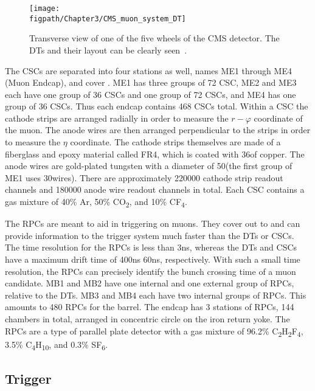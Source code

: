 \begin{figure}[!hbt]
    \centering
    \texttt{[image: \\figpath/Chapter3/CMS\_muon\_system\_DT]}
    \caption{Transverse view of one of the five wheels of the CMS detector. The DTs and their layout can be clearly seen~\cite{Chatrchyan:2008aa}.}
    \label{fig:CMS_muon_system_DT}
\end{figure}

The CSCs are separated into four stations as well, names ME1 through ME4 (Muon Endcap), and cover .
ME1 has three groups of 72 CSC, ME2 and ME3 each have one group of 36 CSCs and one group of 72 CSCs, and ME4 has one group of 36 CSCs.
Thus each endcap contains 468 CSCs total.
Within a CSC the cathode strips are arranged radially in order to measure the $r-\varphi$ coordinate of the muon.
The anode wires are then arranged perpendicular to the strips in order to measure the $\eta$ coordinate.
The cathode strips themselves are made of a fiberglass and epoxy material called FR4, which is coated with 36\mum of copper.
The anode wires are gold-plated tungsten with a diameter of 50\mum (the first group of ME1 uses 30\mum wires).
There are approximately 220000 cathode strip readout channels and 180000 anode wire readout channels in total.
Each CSC contains a gas mixture of 40\% Ar, 50\% CO\textsubscript{2}, and 10\% CF\textsubscript{4}.

The RPCs are meant to aid in triggering on muons.
They cover out to  and can provide information to the trigger system much faster than the DTs or CSCs.
The time resolution for the RPCs is less than 3\unit{ns}, whereas the DTs and CSCs have a maximum drift time of 400\unit{ns} 60\unit{ns}, respectively.
With such a small time resolution, the RPCs can precisely identify the bunch crossing time of a muon candidate.
MB1 and MB2 have one internal and one external group of RPCs, relative to the DTs.
MB3 and MB4 each have two internal groups of RPCs.
This amounts to 480 RPCs for the barrel.
The endcap has 3 stations of RPCs, 144 chambers in total, arranged in concentric circle on the iron return yoke.
The RPCs are a type of parallel plate detector with a gas mixture of 96.2\% C\textsubscript{2}H\textsubscript{2}F\textsubscript{4}, 3.5\% C\textsubscript{4}H\textsubscript{10}, and 0.3\% SF\textsubscript{6}.

\subsection{Trigger}

